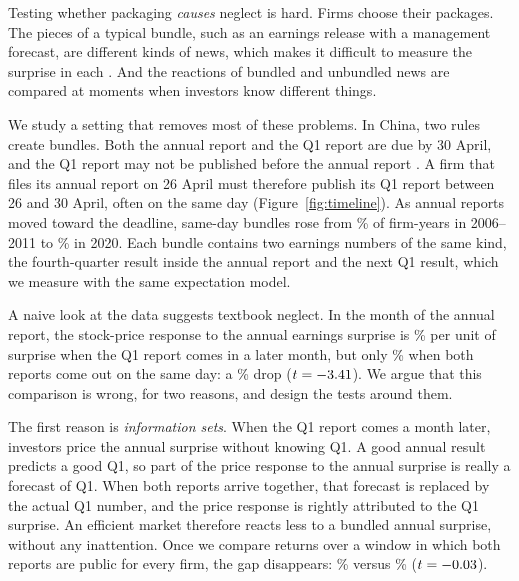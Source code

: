 \documentclass[11pt]{article}
\begin{document}
Testing whether packaging \emph{causes} neglect is hard. Firms choose their packages. The pieces of a typical bundle,
such as an earnings release with a management forecast, are different kinds of news, which makes it difficult to
measure the surprise in each \citep{rogers2013}. And the reactions of bundled and unbundled news are compared at
moments when investors know different things.

We study a setting that removes most of these problems. In China, two rules create bundles. Both the annual report
and the Q1 report are due by 30 April, and the Q1 report may not be published before the annual report
\citep{csrc_disclosure,sse_rules}. A firm that files its annual report on 26 April must therefore publish its Q1
report between 26 and 30 April, often on the same day (Figure~\ref{fig:timeline}). As annual reports moved toward
the deadline, same-day bundles rose from \ShareSDearly\% of firm-years in 2006--2011 to \ShareSDlate\% in 2020. Each
bundle contains two earnings numbers of the same kind, the fourth-quarter result inside the annual report and the
next Q1 result, which we measure with the same expectation model.

A naive look at the data suggests textbook neglect. In the month of the annual report, the stock-price response to
the annual earnings surprise is \NaiveSep\% per unit of surprise when the Q1 report comes in a later month, but only
\NaiveSD\% when both reports come out on the same day: a \NaiveDropPct\% drop ($t=-3.41$). We argue that
this comparison is wrong, for two reasons, and design the tests around them.

The first reason is \emph{information sets}. When the Q1 report comes a month later, investors price the annual
surprise without knowing Q1. A good annual result predicts a good Q1, so part of the price response to the annual
surprise is really a forecast of Q1. When both reports arrive together, that forecast is replaced by the actual Q1
number, and the price response is rightly attributed to the Q1 surprise. An efficient market therefore reacts less
to a bundled annual surprise, without any inattention. Once we compare returns over a window in which both reports
are public for every firm, the gap disappears: \AlignedSep\% versus \AlignedSD\% ($t=-0.03$).
\end{document}
